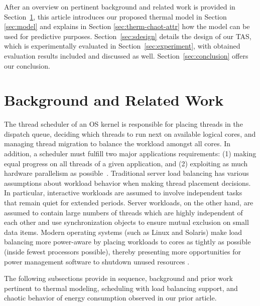 \documentclass[times, 10pt,twocolumn]{IEEEtran}
\begin{document}
After an overview on pertinent background and related work is provided
in Section~\ref{sec:related}, this article introduces our proposed
thermal model in Section \ref{sec:model} and explains in Section
\ref{sec:therm-chaot-attr} how the model can be used for predictive
purposes.  Section~\ref{sec:sdesign} details the design of our TAS,
which is experimentally evaluated in Section~\ref{sec:experiment}, with
obtained evaluation results included and discussed as well.
Section~\ref{sec:conclusion} offers our conclusion.

\newline
\section{Background and Related Work}
\label{sec:related}
The thread scheduler of an OS kernel is responsible for placing threads
in the dispatch queue, deciding which threads to run next on available
logical cores, and managing thread migration to balance the workload
amongst all cores.  In addition, a scheduler must fulfill two major
applications requirements: (1) making equal progress on all threads of a
given application, and (2) exploiting as much hardware parallelism as
possible~\cite{Hofmeyr2010}. Traditional server load balancing has
various assumptions about workload behavior when making thread placement
decisions.  In particular, interactive workloads are assumed to involve
independent tasks that remain quiet for extended periods.  Server
workloads, on the other hand, are assumed to contain large numbers of
threads which are highly independent of each other and use
synchronization objects to ensure mutual exclusion on small data items.
Modern operating systems (such as Linux and Solaris) make load balancing
more power-aware by placing workloads to cores as tightly as possible
(inside fewest processors possible), thereby presenting more
opportunities for power management software to shutdown unused resources
\cite{Sun2009,Sun2009b,Xia2010}.

The following subsections provide in sequence, background and prior work
pertinent to thermal modeling, scheduling with load balancing support,
and chaotic behavior of energy consumption observed in our prior
article.
\end{document}
